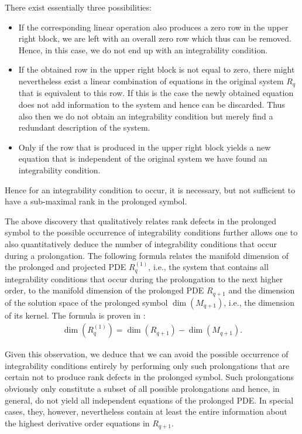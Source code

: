 There exist essentially three possibilities:
\begin{itemize}
    \item If the corresponding linear operation also produces a zero row in the upper right block, we are left with an overall zero row which thus can be removed. 
    Hence, in this case, we do not end up with an integrability condition.\\
    \item If the obtained row in the upper right block is not equal to zero, there might nevertheless exist a linear combination of equations in the original system $R_q$ that is equivalent to this row. 
    If this is the case the newly obtained equation does not add information to the system and hence can be discarded. Thus also then we do not obtain an integrability condition but merely find a redundant description of the system.\\
    \item Only if the row that is produced in the upper right block yields a new equation that is independent of the original system we have found an integrability condition.  
\end{itemize}
Hence for an integrability condition to occur, it is necessary, but not sufficient to have a sub-maximal rank in the prolonged symbol.

The above discovery that qualitatively relates rank defects in the prolonged symbol to the possible occurrence of integrability conditions further allows one  to also quantitatively deduce the number of integrability conditions that occur during a prolongation.
The following formula relates the manifold dimension of the prolonged and projected PDE $R_q^{(1)}$, i.e., the system that contains all integrability conditions that occur during the prolongation to the next higher order, to the manifold dimension of the prolonged PDE $R_{q+1}$ and the dimension of the solution space of the prolonged symbol $\operatorname{dim}(M_{q+1})$, i.e., the dimension of its kernel. The formula is proven in \cite{seiler1994analysis}:
\begin{align}
    \operatorname{dim}(R_{q}^{(1)}) = \operatorname{dim}(R_{q+1}) - \operatorname{dim}(M_{q+1}).
\end{align}

Given this observation, we deduce that we can avoid the possible occurrence of integrability conditions entirely by performing only such prolongations that are certain not to produce rank defects in the prolonged symbol. Such prolongations obviously only constitute a subset of all possible prolongations and hence, in general, do not yield all independent equations of the prolonged PDE. In special cases, they, however, nevertheless contain at least the entire information about the highest derivative order equations in $R_{q+1}$.

